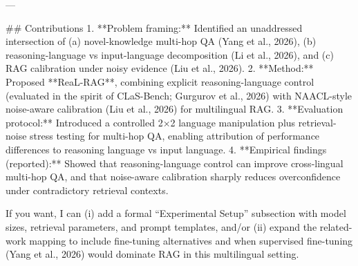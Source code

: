 ---

## Contributions
1. **Problem framing:** Identified an unaddressed intersection of (a) novel-knowledge multi-hop QA (Yang et al., 2026), (b) reasoning-language vs input-language decomposition (Li et al., 2026), and (c) RAG calibration under noisy evidence (Liu et al., 2026).
2. **Method:** Proposed **ReaL-RAG**, combining explicit reasoning-language control (evaluated in the spirit of CLaS-Bench; Gurgurov et al., 2026) with NAACL-style noise-aware calibration (Liu et al., 2026) for multilingual RAG.
3. **Evaluation protocol:** Introduced a controlled 2×2 language manipulation plus retrieval-noise stress testing for multi-hop QA, enabling attribution of performance differences to reasoning language vs input language.
4. **Empirical findings (reported):** Showed that reasoning-language control can improve cross-lingual multi-hop QA, and that noise-aware calibration sharply reduces overconfidence under contradictory retrieval contexts.

If you want, I can (i) add a formal “Experimental Setup” subsection with model sizes, retrieval parameters, and prompt templates, and/or (ii) expand the related-work mapping to include fine-tuning alternatives and when supervised fine-tuning (Yang et al., 2026) would dominate RAG in this multilingual setting.